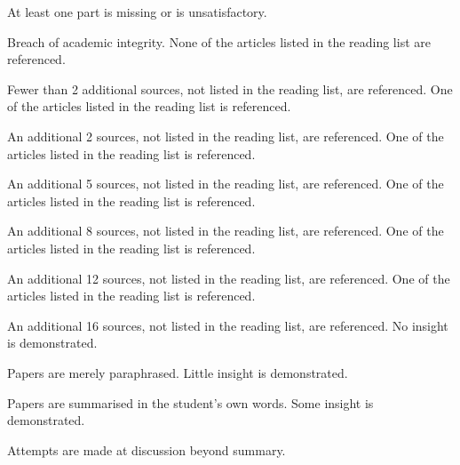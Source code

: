 \documentclass{../../fal_assignment}
\begin{document}
\begin{markingrubric}
%
		\grade\fail At least one part is missing or is unsatisfactory.
        \par Breach of academic integrity.
%
        \grade\fail	None of the articles listed in the reading list are referenced.
        \par		Fewer than 2 additional sources, not listed in the reading list, are referenced.
        \grade		One of the articles listed in the reading list is referenced.
        \par		An additional 2 sources, not listed in the reading list, are referenced.
        \grade		One of the articles listed in the reading list is referenced.
        \par		An additional 5 sources, not listed in the reading list, are referenced.
        \grade		One of the articles listed in the reading list is referenced.
        \par		An additional 8 sources, not listed in the reading list, are referenced.
        \grade		One of the articles listed in the reading list is referenced.
        \par		An additional 12 sources, not listed in the reading list, are referenced.
        \grade		One of the articles listed in the reading list is referenced.
        \par		An additional 16 sources, not listed in the reading list, are referenced.
%
        \grade\fail No insight is demonstrated.
        \par		Papers are merely paraphrased.
        \grade		Little insight is demonstrated.
        \par		Papers are summarised in the student's own words.
        \grade		Some insight is demonstrated.
        \par		Attempts are made at discussion beyond summary.

\end{markingrubric}
\end{document}
